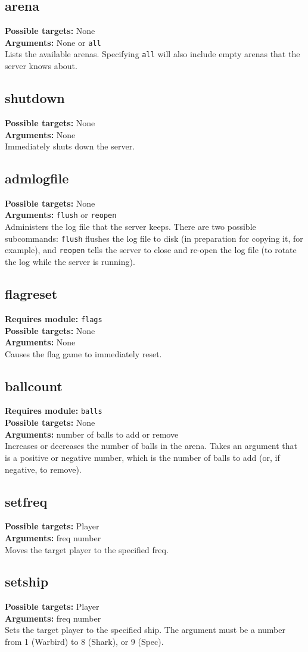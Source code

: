 \documentclass{article}
\newcommand{\requiremod}[1]{\noindent\textbf{Requires module:} \texttt{#1}\\}
\newcommand{\targets}[1]{\noindent\textbf{Possible targets:} #1\\}
\newcommand{\args}[1]{\noindent\textbf{Arguments:} #1\\}
\begin{document}
\subsection{arena}
\targets{None}
\args{None or \texttt{all}}
Lists the available arenas. Specifying \texttt{all} will also include
empty arenas that the server knows about.

\subsection{shutdown}
\targets{None}
\args{None}
Immediately shuts down the server.

\subsection{admlogfile}
\targets{None}
\args{\texttt{flush} or \texttt{reopen}}
Administers the log file that the server keeps. There are two possible
subcommands: \verb/flush/ flushes the log file to disk (in preparation
for copying it, for example), and \verb/reopen/ tells the server to
close and re-open the log file (to rotate the log while the server is
running).

\subsection{flagreset}
\requiremod{flags}
\targets{None}
\args{None}
Causes the flag game to immediately reset.

\subsection{ballcount}
\requiremod{balls}
\targets{None}
\args{number of balls to add or remove}
Increases or decreases the number of balls in the arena. Takes an
argument that is a positive or negative number, which is the number of
balls to add (or, if negative, to remove).

\subsection{setfreq}
\targets{Player}
\args{freq number}
Moves the target player to the specified freq.

\subsection{setship}
\targets{Player}
\args{freq number}
Sets the target player to the specified ship. The argument must be a
number from 1 (Warbird) to 8 (Shark), or 9 (Spec).
\end{document}

